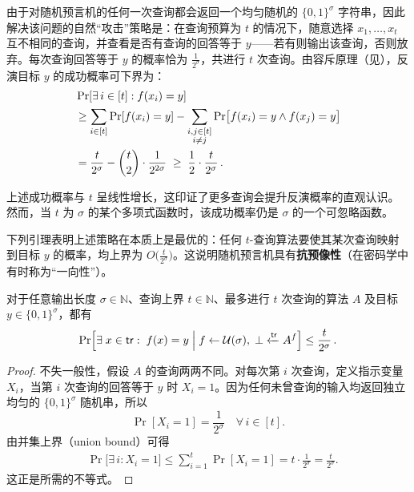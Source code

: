 \documentclass[american,singlepageview]{snargs-book-zh}
\renewcommand{\enspace}{\ensuremath{\thinspace}}
\newcommand{\Bits}{\{0,1\}}
\newcommand{\RandomVariableX}{X}
\newcommand{\Naturals}{\mathbb{N}}
\newcommand{\ProtoAdversary}{A}
\newcommand{\ROFunction}{f}
\newcommand{\ROQueryBound}{t}
\newcommand{\RODistribution}[1]{\mathcal{U}(#1)}
\newcommand{\ROOutputAndTrace}[4]{#4 \xleftarrow{#3} {#2}^{#1}}
\newcommand{\ROQuery}{x}
\newcommand{\ROAnswer}{y}
\newcommand{\ROTrace}{\mathsf{tr}}
\newcommand{\ROAdversary}{\ProtoAdversary}
\newcommand{\ROOutputSize}{\sigma}
\newcommand{\ROOWExpression}[2]{\frac{#2}{2^{#1}}}
\begin{document}
由于对随机预言机的任何一次查询都会返回一个均匀随机的 $\Bits^{\ROOutputSize}$ 字符串，因此解决该问题的自然“攻击”策略是：在查询预算为 $\ROQueryBound$ 的情况下，随意选择 $\ROQuery_{1},\dots,\ROQuery_{\ROQueryBound}$ 互不相同的查询，并查看是否有查询的回答等于 $\ROAnswer$——若有则输出该查询，否则放弃。每次查询回答等于 $\ROAnswer$ 的概率恰为 $\tfrac1{2^{\ROOutputSize}}$，共进行 $\ROQueryBound$ 次查询。由容斥原理（见），反演目标 $\ROAnswer$ 的成功概率可下界为：
\begin{align*}
&\Pr[\exists\,i\in[\ROQueryBound]:\ROFunction(\ROQuery_{i})=\ROAnswer]\\
&\ge
\sum_{i\in[\ROQueryBound]}
\Pr[\ROFunction(\ROQuery_{i})=\ROAnswer]
-
\sum_{\substack{i,j\in[\ROQueryBound]\\i\neq j}}
\Pr\bigl[\ROFunction(\ROQuery_{i})=\ROAnswer\land\ROFunction(\ROQuery_{j})=\ROAnswer\bigr]\\
&=
\frac{\ROQueryBound}{2^{\ROOutputSize}}
-
\binom{\ROQueryBound}{2}\cdot\frac{1}{2^{2\ROOutputSize}}
\;\ge\;
\frac12\cdot\frac{\ROQueryBound}{2^{\ROOutputSize}}
\enspace.
\end{align*}

上述成功概率与 $\ROQueryBound$ 呈线性增长，这印证了更多查询会提升反演概率的直观认识。然而，当 $\ROQueryBound$ 为 $\ROOutputSize$ 的某个多项式函数时，该成功概率仍是 $\ROOutputSize$ 的一个可忽略函数。

下列引理表明上述策略在本质上是最优的：任何 $\ROQueryBound$-查询算法要使其某次查询映射到目标 $\ROAnswer$ 的概率，均上界为 $O\bigl(\tfrac{\ROQueryBound}{2^{\ROOutputSize}}\bigr)$。这说明随机预言机具有\textbf{抗预像性}（在密码学中有时称为“一向性”）。

\begin{lemma}
\label{lemma:rom-ow}
对于任意输出长度 $\ROOutputSize\in\Naturals$、查询上界 $\ROQueryBound\in\Naturals$、最多进行 $\ROQueryBound$ 次查询的算法 $\ROAdversary$ 及目标 $\ROAnswer\in\Bits^{\ROOutputSize}$，都有
\[
\Pr\Bigl[
\exists\;\ROQuery\in\ROTrace:\;\ROFunction(\ROQuery)=\ROAnswer
\;\Big|\;
\ROFunction\gets\RODistribution{\ROOutputSize},\;
\ROOutputAndTrace{\ROFunction}{\ROAdversary}{\ROTrace}{\bot}
\Bigr]
\le
\ROOWExpression{\ROOutputSize}{\ROQueryBound}
\enspace.
\]
\end{lemma}

\begin{proof}
不失一般性，假设 $\ROAdversary$ 的查询两两不同。对每次第 $i$ 次查询，定义指示变量 $\RandomVariableX_{i}$，当第 $i$ 次查询的回答等于 $\ROAnswer$ 时 $\RandomVariableX_{i}=1$。因为任何未曾查询的输入均返回独立均匀的 $\Bits^{\ROOutputSize}$ 随机串，所以
\[
\Pr[\RandomVariableX_{i}=1]
=
\frac{1}{2^{\ROOutputSize}}
\quad
\forall\,i\in[\ROQueryBound].
\]
由并集上界（union bound）可得
\begin{align*}
&\Pr\bigl[\exists\,i:\RandomVariableX_{i}=1\bigr]
\le
\sum_{i=1}^{\ROQueryBound}\Pr[\RandomVariableX_{i}=1]
=
\ROQueryBound\cdot\frac1{2^{\ROOutputSize}}
=
\ROOWExpression{\ROOutputSize}{\ROQueryBound}.
\end{align*}
这正是所需的不等式。
\end{proof}
\end{document}
